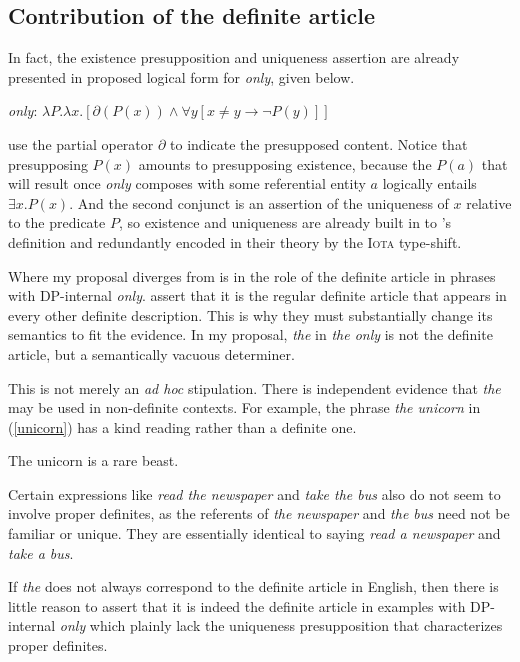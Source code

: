 \subsection{Contribution of the definite article}
In fact, the existence presupposition and uniqueness assertion are already presented in  proposed logical form for \textit{only}, given below.

\begin{exe}
	\ex \textit{only}: $ \lambda P . \lambda x . [ \partial(P(x)) \land \forall y [ x \ne y \to \neg P(y) ] ] $
\end{exe}

\citeauthor{cb2015} use the partial operator $\partial$ to indicate the presupposed content. Notice that presupposing $P(x)$ amounts to presupposing existence, because the $P(a)$ that will result once \textit{only} composes with some referential entity $a$ logically entails $\exists x . P(x)$. And the second conjunct is an assertion of the uniqueness of $x$ relative to the predicate $P$, so existence and uniqueness are already built in to \citeauthor{cb2015}'s definition and redundantly encoded in their theory by the \textsc{Iota} type-shift.

Where my proposal diverges from  is in the role of the definite article in phrases with DP-internal \textit{only}. \citeauthor{cb2015} assert that it is the regular definite article that appears in every other definite description. This is why they must substantially change its semantics to fit the evidence. In my proposal, \textit{the} in \textit{the only} is not the definite article, but a semantically vacuous determiner.

This is not merely an \textit{ad hoc} stipulation. There is independent evidence that \textit{the} may be used in non-definite contexts. For example, the phrase \textit{the unicorn} in (\ref{unicorn}) has a kind reading rather than a definite one.

\begin{exe}
	\ex \label{unicorn} The unicorn is a rare beast.
\end{exe}

Certain expressions like \textit{read the newspaper} and \textit{take the bus} also do not seem to involve proper definites, as the referents of \textit{the newspaper} and \textit{the bus} need not be familiar or unique. They are essentially identical to saying \textit{read a newspaper} and \textit{take a bus}.

If \textit{the} does not always correspond to the definite article in English, then there is little reason to assert that it is indeed the definite article in examples with DP-internal \textit{only} which plainly lack the uniqueness presupposition that characterizes proper definites.